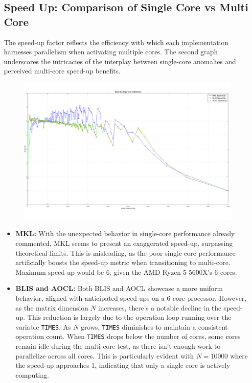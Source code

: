 \subsection{Speed Up: Comparison of Single Core vs Multi Core}

The speed-up factor reflects the efficiency with which each implementation harnesses parallelism when activating multiple cores. The second graph underscores the intricacies of the interplay between single-core anomalies and perceived multi-core speed-up benefits.

\begin{figure}[h!] %
    \centering
    \includegraphics[width=\linewidth]{Figures/Imagenes/Final2.png} %
\end{figure}
\vspace{-1em}
\begin{itemize}
    \item \textbf{MKL:} With the unexpected behavior in single-core performance already commented, MKL seems to present an exaggerated speed-up, surpassing theoretical limits. This is misleading, as the poor single-core performance artificially boosts the speed-up metric when transitioning to multi-core. Maximum speed-up would be 6, given the AMD Ryzen 5 5600X's 6 cores.
    
    \item \textbf{BLIS and AOCL:} Both BLIS and AOCL showcase a more uniform behavior, aligned with anticipated speed-ups on a 6-core processor. However, as the matrix dimension \( N \) increases, there's a notable decline in the speed-up. This reduction is largely due to the operation loop running over the variable \texttt{TIMES}. As \( N \) grows, \texttt{TIMES} diminishes to maintain a consistent operation count. When \texttt{TIMES} drops below the number of cores, some cores remain idle during the multi-core test, as there isn't enough work to parallelize across all cores. This is particularly evident with \( N=10000 \) where the speed-up approaches 1, indicating that only a single core is actively computing.

\end{itemize}


